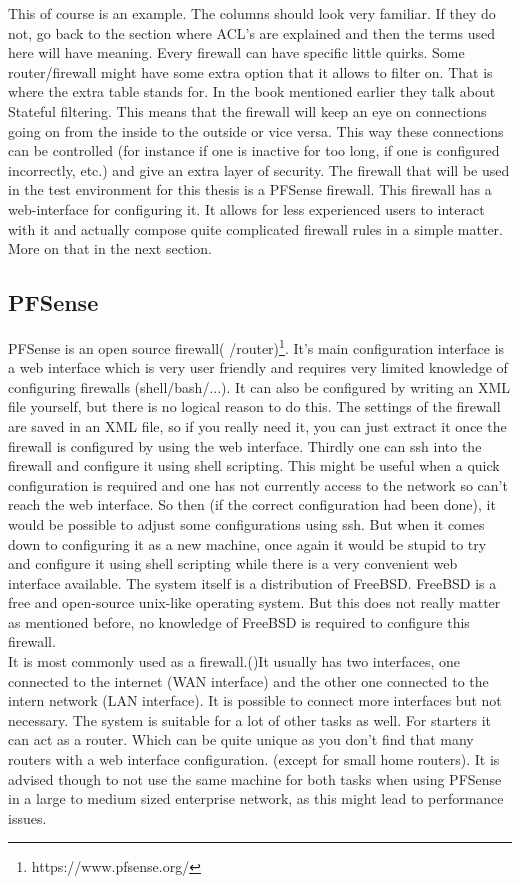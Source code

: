 This of course is an example. The columns should look very familiar. If they do not, go back to the section where ACL's are explained and then the terms used here will have meaning.
Every firewall can have specific little quirks. Some router/firewall might have some extra option that it allows to filter on. That is where the extra table stands for. In the book mentioned earlier they talk about Stateful filtering. This means that the firewall will keep an eye on connections going on from the inside to the outside or vice versa. This way these connections can be controlled (for instance if one is inactive for too long, if one is configured incorrectly, etc.) and give an extra layer of security. The firewall that will be used in the test environment for this thesis is a PFSense firewall. This firewall has a web-interface for configuring it. It allows for less experienced users to interact with it and actually compose quite complicated firewall rules in a simple matter. More on that in the next section.
\subsection{PFSense}
PFSense is an open source firewall( /router)\footnote{https://www.pfsense.org/}. It's main configuration interface is a web interface which is very user friendly and requires very limited knowledge of configuring firewalls (shell/bash/...). It can also be configured by writing an XML file yourself, but there is no logical reason to do this. The settings of the firewall are saved in an XML file, so if you really need it, you can just extract it once the firewall is configured by using the web interface. Thirdly one can ssh into the firewall and configure it using shell scripting. This might be useful when a quick configuration is required and one has not currently access to the network so can't reach the web interface. So then (if the correct configuration had been done), it would be possible to adjust some configurations using ssh. But when it comes down to configuring it as a new machine, once again it would be stupid to try and configure it using shell scripting while there is a very convenient web interface available.
The system itself is a distribution of FreeBSD. FreeBSD is a free and open-source unix-like operating system. But this does not really matter as mentioned before, no knowledge of FreeBSD is required to configure this firewall.\\
It is most commonly used as a firewall.(\textcite{pfSenseGuide})It usually has two interfaces, one connected to the internet (WAN interface) and the other one connected to the intern network (LAN interface). It is possible to connect more interfaces but not necessary. The system is suitable for a lot of other tasks as well. For starters it can act as a router. Which can be quite unique as you don't find that many routers with a web interface configuration. (except for small home routers). It is advised though to not use the same machine for both tasks when using PFSense in a large to medium sized enterprise network, as this might lead to performance issues.\\

